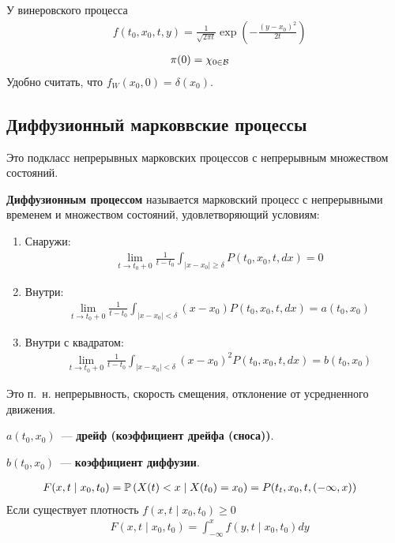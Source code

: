 \begin{example}
    У винеровского процесса
    \begin{align*}
      & f(t_0,x_0, t, y) = \frac{1}{\sqrt{2\pi t}} \exp\left( -\frac{(y-x_0)^2}{2t} \right) 
    \end{align*}
    \begin{align*}
      & \pi(0) = \chi_{0 \in \mathcal{B}}
    \end{align*}
    Удобно считать, что $f_W(x_0, 0) = \delta(x_0)$.
\end{example}
\subsection{Диффузионный марковвские процессы}
Это подкласс непрерывных марковских процессов с непрерывным множеством
состояний.
\begin{Def}
    \textbf{Диффузионным процессом} называется марковский процесс с непрерывными
    временем и множеством состояний, удовлетворяющий условиям:
    \begin{enumerate}
        \item Снаружи:
        \begin{align*}
          & \lim_{t \to t_0+0} \frac{1}{t-t_0}\int_{\left| x-x_0 \right|\geq \delta} P(t_0,x_0,t,dx) = 0
        \end{align*}
        \item Внутри:
        \begin{align*}
          & \lim_{t \to t_0+0} \frac{1}{t-t_0}\int_{\left| x-x_0 \right| < \delta} (x-x_0) P(t_0,x_0,t,dx) = a(t_0,x_0)
        \end{align*}
        \item Внутри с квадратом:
        \begin{align*}
          & \lim_{t \to t_0+0} \frac{1}{t-t_0}\int_{\left| x-x_0 \right| < \delta} (x-x_0)^2 P(t_0,x_0,t,dx) = b(t_0,x_0)
        \end{align*}
    \end{enumerate}
    Это п.~н. непрерывность, скорость смещения, отклонение от усредненного движения.
\end{Def}
\begin{Def}
    $a(t_0,x_0)$~--- \textbf{дрейф (коэффициент дрейфа (сноса))}.
\end{Def}
\begin{Def}
    $b(t_0,x_0)$~--- \textbf{коэффициент диффузии}.
\end{Def}
\begin{Des}
    \begin{align*}
      & F(x,t \mid x_0,t_0) = \mathbb{P}\left( X(t)< x \mid X(t_0) = x_0 \right) = P(t_t,x_0,t,(-\infty,x))
    \end{align*}
    Если существует плотность $f(x,t \mid x_0,t_0)\geq 0$
    \begin{align*}
      & F(x,t \mid x_0,t_0) = \int_{-\infty}^xf(y,t \mid x_0,t_0)dy
    \end{align*}  
\end{Des}

